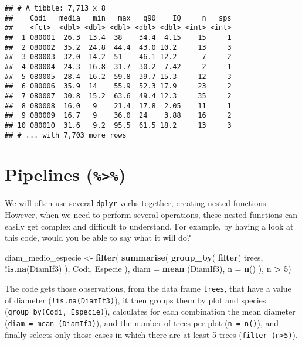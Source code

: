 \documentclass[]{article}
\newenvironment{Shaded}{\begin{snugshade}}{\end{snugshade}}
\newcommand{\KeywordTok}[1]{\textcolor[rgb]{0.13,0.29,0.53}{\textbf{#1}}}
\newcommand{\DataTypeTok}[1]{\textcolor[rgb]{0.13,0.29,0.53}{#1}}
\newcommand{\DecValTok}[1]{\textcolor[rgb]{0.00,0.00,0.81}{#1}}
\newcommand{\StringTok}[1]{\textcolor[rgb]{0.31,0.60,0.02}{#1}}
\newcommand{\OperatorTok}[1]{\textcolor[rgb]{0.81,0.36,0.00}{\textbf{#1}}}
\newcommand{\NormalTok}[1]{#1}
\begin{document}
\begin{verbatim}
## # A tibble: 7,713 x 8
##    Codi   media   min   max   q90    IQ     n   sps
##    <fct>  <dbl> <dbl> <dbl> <dbl> <dbl> <int> <int>
##  1 080001  26.3  13.4  38    34.4  4.15    15     1
##  2 080002  35.2  24.8  44.4  43.0 10.2     13     3
##  3 080003  32.0  14.2  51    46.1 12.2      7     2
##  4 080004  24.3  16.8  31.7  30.2  7.42     2     1
##  5 080005  28.4  16.2  59.8  39.7 15.3     12     3
##  6 080006  35.9  14    55.9  52.3 17.9     23     2
##  7 080007  30.8  15.2  63.6  49.4 12.3     35     2
##  8 080008  16.0   9    21.4  17.8  2.05    11     1
##  9 080009  16.7   9    36.0  24    3.88    16     2
## 10 080010  31.6   9.2  95.5  61.5 18.2     13     3
## # ... with 7,703 more rows
\end{verbatim}

\newpage

\section{\texorpdfstring{Pipelines
(\texttt{\%\textgreater{}\%})}{Pipelines (\%\textgreater{}\%)}}\label{pipelines}

We will often use several \texttt{dplyr} verbs together, creating nested
functions. However, when we need to perform several operations, these
nested functions can easily get complex and difficult to understand. For
example, by having a look at this code, would you be able to say what it
will do?

\begin{Shaded}
\begin{Highlighting}[]
\NormalTok{diam_medio_especie <-}\StringTok{ }\KeywordTok{filter}\NormalTok{(}
    \KeywordTok{summarise}\NormalTok{(}
        \KeywordTok{group_by}\NormalTok{(}
            \KeywordTok{filter}\NormalTok{(}
\NormalTok{                trees,}
                \OperatorTok{!}\KeywordTok{is.na}\NormalTok{(DiamIf3)}
\NormalTok{            ),}
\NormalTok{        Codi, Especie}
\NormalTok{        ),}
    \DataTypeTok{diam =} \KeywordTok{mean}\NormalTok{ (DiamIf3),}
    \DataTypeTok{n =} \KeywordTok{n}\NormalTok{()}
\NormalTok{    ),}
\NormalTok{n }\OperatorTok{>}\StringTok{ }\DecValTok{5}\NormalTok{)}
\end{Highlighting}
\end{Shaded}

The code gets those observations, from the data frame \texttt{trees},
that have a value of diameter (\texttt{!is.na(DiamIf3)}), it then groups
them by plot and species (\texttt{group\_by(Codi,\ Especie)}),
calculates for each combination the mean diameter
(\texttt{diam\ =\ mean\ (DiamIf3)}), and the number of trees per plot
(\texttt{n\ =\ n()}), and finally selects only those cases in which
there are at least 5 trees (\texttt{filter\ (n\textgreater{}5)}).
\end{document}
